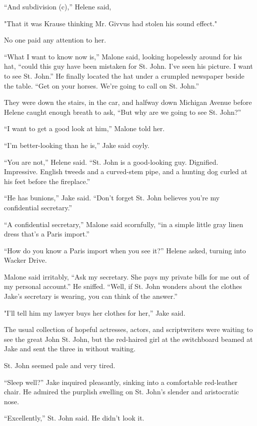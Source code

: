 \documentclass{novel}
\begin{document}
“And subdivision (c),” Helene said,

"That it was Krause thinking Mr. Givvus had stolen his sound effect."

No one paid any attention to her.

“What I want to know now is,” Malone said, looking hopelessly around for his hat, “could this guy have been mistaken for St. John. I've seen his picture. I want to see St. John.” He finally located the hat under a crumpled newspaper beside the table. “Get on your horses. We’re going to call on St. John.”

They were down the stairs, in the car, and halfway down Michigan Avenue before Helene caught enough breath to ask, “But why are we going to see St. John?”

“I want to get a good look at him,” Malone told her.

“I’m better-looking than he is,” Jake said coyly.

“You are not,” Helene said. “St. John is a good-looking guy. Dignified. Impressive. English tweeds and a curved-stem pipe, and a hunting dog curled at his feet before the fireplace.”

“He has bunions,” Jake said. “Don’t forget St. John believes you’re my confidential secretary.”

“A confidential secretary,” Malone said scornfully, “in a simple little gray linen dress that’s a Paris import.”

“How do you know a Paris import when you see it?” Helene asked, turning into Wacker Drive.

Malone said irritably, “Ask my secretary. She pays my private bills for me out of my personal account.” He sniffed. “Well, if St. John wonders about the clothes Jake’s secretary is wearing, you can think of the answer.”

"I'll tell him my lawyer buys her clothes for her,” Jake said.

The usual collection of hopeful actresses, actors, and scriptwriters were waiting to see the great John St. John, but the red-haired girl at the switchboard beamed at Jake and sent the three in without waiting.

St. John seemed pale and very tired.

“Sleep well?” Jake inquired pleasantly, sinking into a comfortable red-leather chair. He admired the purplish swelling on St. John’s slender and aristocratic nose.

“Excellently,” St. John said. He didn’t look it.
\end{document}
